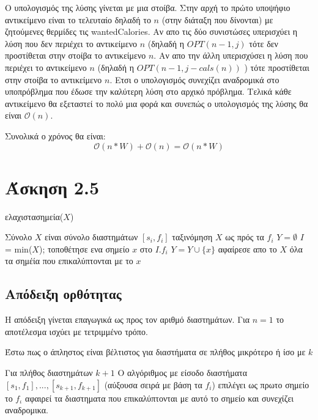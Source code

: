 \documentclass{article}
\renewcommand{\O}{\mathcal{O}}
\begin{document}
Ο υπολογισμός της λύσης γίνεται με μια στοίβα. Στην αρχή το πρώτο υποψήφιο αντικείμενο είναι
το τελευταίο δηλαδή το $n$ (στην διάταξη που δίνονται) με ζητούμενες θερμίδες τις wantedCalories. Αν απο τις δύο συνιστώσες υπερισχύει
η λύση που δεν περιέχει το αντικείμενο $n$ (δηλαδή η $OPT(n-1,j)$ τότε δεν προστίθεται στην στοίβα το
αντικείμενο $n$. Αν απο την άλλη υπερισχύσει η λύση που περιέχει το αντικείμενο $n$ (δηλαδή η $OPT(n-1,j-cals(n))$ )
τότε προστίθεται στην στοίβα το αντικείμενο $n$. Ετσι ο υπολογισμός συνεχίζει αναδρομικά στο υποπρόβλημα που έδωσε την καλύτερη
λύση στο αρχικό πρόβλημα. Τελικά κάθε αντικείμενο θα εξεταστεί το πολύ μια φορά και συνεπώς ο υπολογισμός της λύσης θα είναι $\O(n)$.

Συνολικά ο χρόνος θα είναι:
\[
	\O(n*W) + \O(n) = \O(n*W)
\]  
\section{Άσκηση 2.5}
\begin{algorithm}\caption{ελαχιστασημεία($X$)}\label{partition}
  \begin{algorithmic}[1]
  \REQUIRE Σύνολο $Χ$ είναι σύνολο διαστημάτων $[s_i,f_i]$
  \STATE ταξινόμηση $X$ ως πρός τα $f_i$
  \STATE $ Y = \emptyset$
  	\STATE $ I $ = min($X$);
  	\STATE τοποθέτησε ενα σημείο $x$ στο $I.f_i$
  	\STATE $Y = Y \cup \{x\}$
  	\STATE αφαίρεσε απο το $Χ$ όλα τα σημέία που επικαλύπτονται με το $x$ 
   \ENDWHILE 
  \end{algorithmic}
\end{algorithm}	
\subsection{Απόδειξη ορθότητας}
Η απόδειξη γίνεται επαγωγικά ως προς τον αριθμό διαστημάτων.
Για $n = 1$ το αποτέλεσμα ισχύει με τετριμμένο τρόπο.

Έστω πως ο άπληστος είναι βέλτιστος για διαστήματα σε πλήθος μικρότερο ή ίσο με $k$

Για πλήθος διαστημάτων $k+1$ 
Ο αλγόριθμος με είσοδο διαστήματα $[s_1,f_1] , ... , [s_{k+1},f_{k+1}]$ (αύξουσα σειρά με βάση τα $f_i$)
επιλέγει ως πρωτο σημείο το $f_ι$ αφαιρεί τα διαστηματα που επικαλύπτονται με αυτό το σημείο και συνεχίζει
αναδρομικα.
\end{document}
